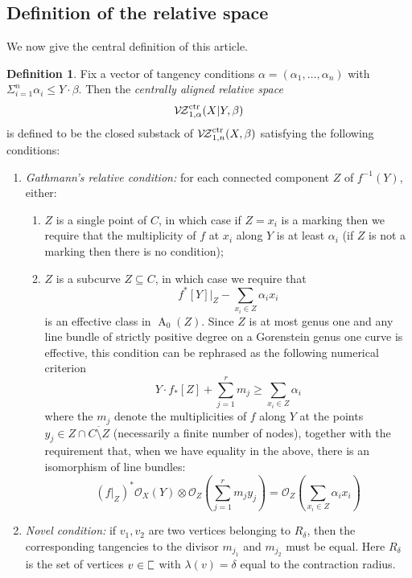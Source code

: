 \documentclass[11pt]{amsart}
\newcommand{\plC}{\scalebox{0.8}[1.3]{$\sqsubset$}}
\newcommand{\VZc}[4]{\mathcal{V\!Z}^{\rm{ctr}}_{#1,#2}(#3,#4)}
\newcommand{\OO}{\mathcal{O}}
\newcommand{\Achow}{\operatorname{A}}
\theoremstyle{definition}
\theoremstyle{definition}
\newtheorem{dfn}[thm]{Definition}
\begin{document}
\subsection{Definition of the relative space} We now give the central definition of this article.
\begin{dfn}
Fix a vector of tangency conditions $\alpha=(\alpha_1,\ldots,\alpha_n)$ with $\Sigma_{i=1}^n \alpha_i \leq Y \cdot \beta$. Then the \emph{centrally aligned relative space} 
\begin{equation*}\VZc{1}{\alpha}{X|Y}{\beta} \end{equation*}
is defined to be the closed substack of $\VZc{1}{n}{X}{\beta}$ satisfying the following conditions:
\begin{enumerate}
\item \emph{Gathmann's relative condition:} for each connected component $Z$ of $f^{-1}(Y)$, either:
\begin{enumerate}
\item $Z$ is a single point of $C$, in which case if $Z=x_i$ is a marking then we require that the multiplicity of $f$ at $x_i$ along $Y$ is at least $\alpha_i$ (if $Z$ is not a marking then there is no condition);
\item $Z$ is a subcurve $Z \subseteq C$, in which case we require that
\begin{equation*} f^*[Y]|_Z -\sum_{x_i\in Z}\alpha_ix_i\end{equation*}
is an effective class in $\Achow_0(Z)$. Since $Z$ is at most genus one and any line bundle of strictly positive degree on a Gorenstein genus one curve is effective, this condition can be rephrased as the following numerical criterion
\begin{equation*} Y \cdot f_*[Z]+\sum_{j=1}^r m_j\geq \sum_{x_i\in Z}\alpha_i \end{equation*}
where the $m_j$ denote the multiplicities of $f$ along $Y$ at the points $y_j \in Z \cap \overline{C \setminus Z}$ (necessarily a finite number of nodes), together with the requirement that, when we have equality in the above, there is an isomorphism of line bundles:
\begin{equation*} (f|_{Z})^*\OO_X(Y) \otimes \OO_Z\left(\sum_{j=1}^r m_j y_j\right)=\OO_Z\left(\sum_{x_i\in Z}\alpha_ix_i\right)\end{equation*}
\end{enumerate}

\item \emph{Novel condition:} if $v_1,v_2$ are two vertices belonging to $R_\delta$, then the corresponding tangencies to the divisor $m_{j_1}$ and $m_{j_2}$ must be equal. Here $R_\delta$ is the set of vertices $v \in \plC$ with $\lambda(v)=\delta$ equal to the contraction radius.
\end{enumerate}
\end{dfn}
\end{document}
